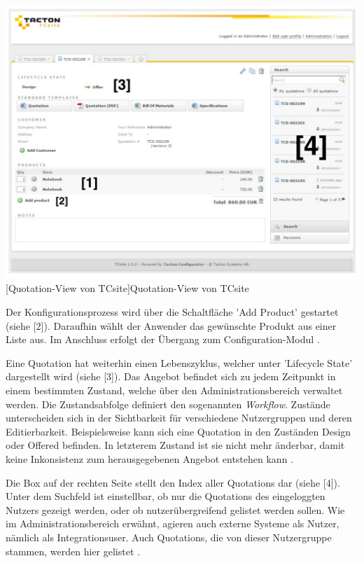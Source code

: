 \documentclass[11pt, a4paper, titlepage, listof=totoc, bibliography=totoc, index=totoc, twoside, openright, headings=normal]{scrreprt}
\begin{document}
\vspace{1em}
\begin{minipage}{\linewidth}
	\centering
	\includegraphics[width=1\linewidth]{Abbildungen/tcsiteQuotationNumbered.pdf}
	[Quotation-View von TCsite]{Quotation-View von TCsite}
	\label{fig:tcsiteQuotationNumbered}
\end{minipage}
\vspace{1em}

Der Konfigurationsprozess wird über die Schaltfläche 'Add Product' gestartet (siehe [2]). Daraufhin wählt der Anwender das gewünschte Produkt aus einer Liste aus. Im Anschluss erfolgt der Übergang zum Configuration-Modul \citep{tactonTCsiteReferenceManual}.

Eine Quotation hat weiterhin einen Lebenszyklus, welcher unter 'Lifecycle State' dargestellt wird (siehe [3]). Das Angebot befindet sich zu jedem Zeitpunkt in einem bestimmten Zustand, welche über den Administrationsbereich verwaltet werden. Die Zustandsabfolge definiert den sogenannten \emph{Workflow}. Zustände unterscheiden sich in der Sichtbarkeit für verschiedene Nutzergruppen und deren Editierbarkeit. Beispielsweise kann sich eine Quotation in den Zuständen \glqq Design\grqq{} oder \glqq Offered\grqq{} befinden. In letzterem Zustand ist sie nicht mehr änderbar, damit keine Inkonsistenz zum herausgegebenen Angebot entstehen kann \citep{tactonTCsiteReferenceManual}.

Die Box auf der rechten Seite stellt den Index aller Quotations dar (siehe [4]). Unter dem Suchfeld ist einstellbar, ob nur die Quotations des eingeloggten Nutzers gezeigt werden, oder ob nutzerübergreifend gelistet werden sollen. Wie im Administrationsbereich erwähnt, agieren auch externe Systeme als Nutzer, nämlich als Integrationsuser. Auch Quotations, die von dieser Nutzergruppe stammen, werden hier gelistet \citep{tactonTCsiteReferenceManual}.
\end{document}
